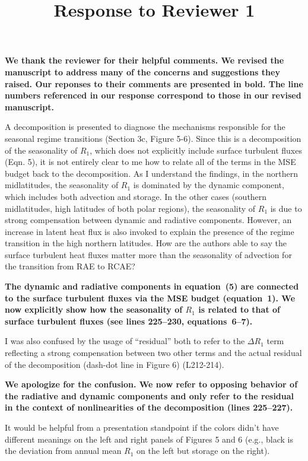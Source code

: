 \documentclass{article}
\title{\vspace{-2.5cm}Response to Reviewer 1\vspace{-2cm}}
\date{}
\author{}
\begin{document}
\maketitle

\textbf{We thank the reviewer for their helpful comments. We revised the manuscript to address many of the concerns and suggestions they raised. Our reponses to their comments are presented in bold. The line numbers referenced in our response correspond to those in our revised manuscript.}

A decomposition is presented to diagnose the mechanisms responsible for the seasonal regime transitions (Section 3c, Figure 5-6). Since this is a decomposition of the seasonality of $R_1$, which does not explicitly include surface turbulent fluxes (Eqn. 5), it is not entirely clear to me how to relate all of the terms in the MSE budget back to the decomposition. As I understand the findings, in the northern midlatitudes, the seasonality of $R_1$ is dominated by the dynamic component, which includes both advection and storage. In the other cases (southern midlatitudes, high latitudes of both polar regions), the seasonality of $R_1$ is due to strong compensation between dynamic and radiative components. However, an increase in latent heat flux is also invoked to explain the presence of the regime transition in the high northern latitudes. How are the authors able to say the surface turbulent heat fluxes matter more than the seasonality of advection for the transition from RAE to RCAE?

\textbf{The dynamic and radiative components in equation~(5) are connected to the surface turbulent fluxes via the MSE budget (equation~1). We now explicitly show how the seasonality of $R_1$ is related to that of surface turbulent fluxes (see lines 225--230, equations~6--7). }

I was also confused by the usage of ``residual'' both to refer to the $\Delta R_1$ term reflecting a strong compensation between two other terms and the actual residual of the decomposition (dash-dot line in Figure 6) (L212-214).

\textbf{We apologize for the confusion. We now refer to opposing behavior of the radiative and dynamic components and only refer to the residual in the context of nonlinearities of the decomposition (lines 225--227).}

It would be helpful from a presentation standpoint if the colors didn't have different meanings on the left and right panels of Figures 5 and 6 (e.g., black is the deviation from annual mean $R_1$ on the left but storage on the right).
\end{document}
